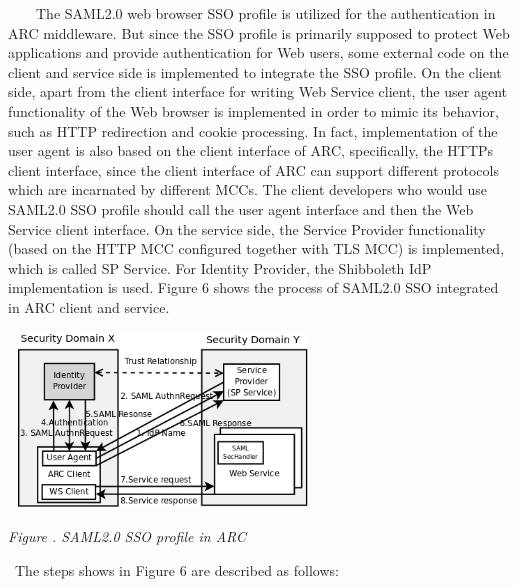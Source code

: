 \documentclass[a4paper]{article}
\newcounter{Figure}
\renewcommand\theFigure{\arabic{Figure}}
\begin{document}
{\upshape\color{black}
\ \ \ \ The SAML2.0 web browser SSO profile is utilized for the
authentication in ARC middleware. But since the SSO profile is
primarily supposed to protect Web applications and provide
authentication for Web users, some external code on the client and
service side is implemented to integrate the SSO profile. On the client
side, apart from the client interface for writing Web Service client,
the user agent functionality of the Web browser is implemented in order
to mimic its behavior, such as HTTP redirection and cookie processing.
In fact, implementation of the user agent is also based on the client
interface of ARC, specifically, the HTTPs client interface, since the
client interface of ARC can support different protocols which are
incarnated by different MCCs. The client developers who would use
SAML2.0 SSO profile should call the user agent interface and then the
Web Service client interface. On the service side, the Service Provider
functionality (based on the HTTP MCC configured together with TLS MCC)
is implemented, which is called SP Service. For Identity Provider, the
Shibboleth IdP implementation is used. Figure 6 shows the process of
SAML2.0 SSO integrated in ARC client and service.}



\begin{center}
\includegraphics[width=3.2256in,height=1.8472in]{SecurityFrameworkofARC1-img7.png}
\end{center}

\bigskip

{\centering{}\itshape\color{black}
Figure \stepcounter{Figure}{\theFigure}.\textbf{ }SAML2.0 SSO profile in
ARC
\par}

{\color{black}
\ The steps shows in Figure 6 are described as follows:}
\end{document}
